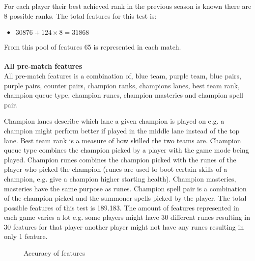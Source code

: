 For each player their best achieved rank in the previous season is known there are 8 possible ranks. The total features for this test is: 
\begin{itemize}
\item $30876 + 124\times8 = 31868$
\end{itemize}
From this pool of features 65 is represented in each match. \\\\
\textbf{All pre-match features}\\
All pre-match features is a combination of, blue team, purple team, blue pairs, purple pairs, counter pairs, champion ranks, champions lanes, best team rank, champion queue type, champion runes, champion masteries and champion spell pair.  

Champion lanes describe which lane a given champion is played on e.g. a champion might perform better if played in the middle lane instead of the top lane. Best team rank is a measure of how skilled the two teams are. Champion queue type combines the champion picked by a player with the game mode being played. Champion runes combines the champion picked with the runes of the player who picked the champion (runes are used to boot certain skills of a champion, e.g. give a champion higher starting health). Champion masteries, masteries have the same purpose as runes. Champion spell pair is a combination of the champion picked and the summoner spells picked by the player. The total possible features of this test is 189.183. The amount of features represented in each game varies a lot e.g. some players might have 30 different runes resulting in 30 features for that player another player might not have any runes resulting in only 1 feature.
\begin{figure}[!htb]
  \centering
   \caption{Accuracy of features}\label{fig:cluster-feat}
\end{figure}

